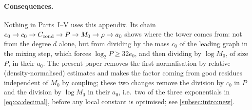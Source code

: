 \paragraph{Consequences.} Nothing in Parts~I--V uses this
appendix. Its chain $e_0\to c_0\to C_{\rm cond}\to P\to M_0\to
\rho\to a_0$ shows where the tower comes from: not from the degree
$d$ alone, but from dividing by the mass $c_0$ of the leading
graph in the mixing step, which forces $\log_2P\ge32e_0$, and
then dividing by $\log M_0$, of size $P$, in their $a_0$. The present paper
removes the first normalisation by relative (density-normalised)
estimates and makes the factor coming from good residues
independent of $M_0$ by coupling; these two changes remove the
division by $c_0$ in $P$ and the division by $\log M_0$ in their
$a_0$, i.e.\ two of the three exponentials in
\eqref{eq:oa:decimal}, before any local constant is optimised;
see \cref{subsec:intro:new}.
